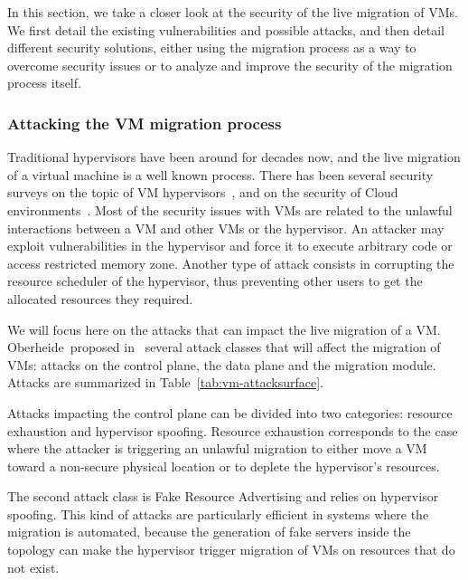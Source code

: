 In this section, we take a closer look at the security of the live migration of VMs.
We first detail the existing vulnerabilities and possible attacks, and then detail different security solutions, either using the migration process as a way to overcome security issues or to analyze and improve the security of the migration process itself.

\subsubsection{Attacking the VM migration process}
Traditional hypervisors have been around for decades now, and the live migration of a virtual machine is a well known process. There has been several security surveys on the topic of VM hypervisors~\cite{Reuben2007,Rehman2013,Sahoo2010,Perez-Botero2013}, and on the security of Cloud environments~\cite{cloudenvironmentsecuritysurvey-fernandes2014}.
Most of the security issues with VMs are related to the unlawful interactions between a VM and other VMs or the hypervisor.
An attacker may exploit vulnerabilities in the hypervisor and force it to execute arbitrary code or access restricted memory zone.
Another type of attack consists in corrupting the resource scheduler of the hypervisor, thus preventing other users to get the allocated resources they required.

We will focus here on the attacks that can impact the live migration of a VM.
Oberheide~\etal proposed in~\cite{empirical-oberheide2008} several attack classes that will affect the migration of VMs: attacks on the control plane, the data plane and the migration module.
Attacks are summarized in Table~\ref{tab:vm-attacksurface}.

Attacks impacting the control plane can be divided into two categories: resource exhaustion and hypervisor spoofing. Resource exhaustion corresponds to the case where the attacker is triggering an unlawful migration to either move a VM toward a non-secure physical location or to deplete the hypervisor's resources.

The second attack class is Fake Resource Advertising and relies on hypervisor spoofing. This kind of attacks are particularly efficient in systems where the migration is automated, because the generation of fake servers inside the topology can make the hypervisor trigger migration of VMs on resources that do not exist.

